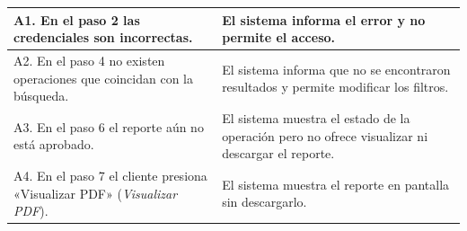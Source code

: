 {\begin{longtable}{L{0.45\textwidth} L{0.49\textwidth}}
\midrule
A1. En el paso 2 las credenciales son incorrectas. & El sistema informa el error y no permite el acceso. \\
\midrule
A2. En el paso 4 no existen operaciones que coincidan con la búsqueda. & El sistema informa que no se encontraron resultados y permite modificar los filtros. \\
\midrule
A3. En el paso 6 el reporte aún no está aprobado. & El sistema muestra el estado de la operación pero no ofrece visualizar ni descargar el reporte. \\
\midrule
A4. En el paso 7 el cliente presiona «Visualizar PDF» (\textit{Visualizar PDF}). & El sistema muestra el reporte en pantalla sin descargarlo. \\
\bottomrule
\end{longtable}
}
